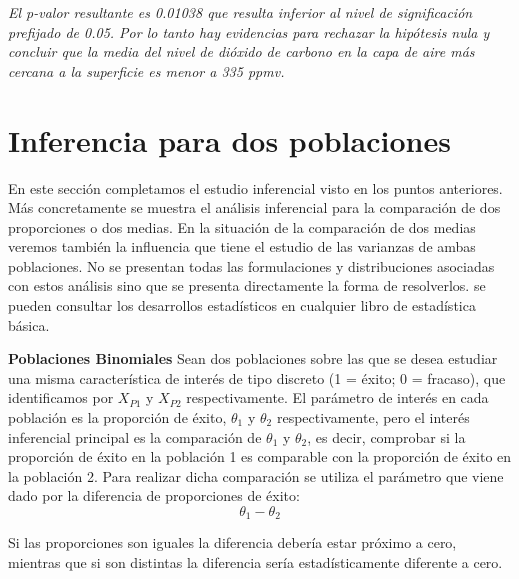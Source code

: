 \documentclass[
]{book}
\begin{document}
\emph{El p-valor resultante es 0.01038 que resulta inferior al nivel de significación prefijado de 0.05. Por lo tanto hay evidencias para rechazar la hipótesis nula y concluir que la media del nivel de dióxido de carbono en la capa de aire más cercana a la superficie es menor a 335 ppmv.}

\hypertarget{inferencia-para-dos-poblaciones}{%
\section{Inferencia para dos poblaciones}\label{inferencia-para-dos-poblaciones}}

En este sección completamos el estudio inferencial visto en los puntos anteriores. Más concretamente se muestra el análisis inferencial para la comparación de dos proporciones o dos medias. En la situación de la comparación de dos medias veremos también la influencia que tiene el estudio de las varianzas de ambas poblaciones. No se presentan todas las formulaciones y distribuciones asociadas con estos análisis sino que se presenta directamente la forma de resolverlos. se pueden consultar los desarrollos estadísticos en cualquier libro de estadística básica.

\textbf{Poblaciones Binomiales} Sean dos poblaciones sobre las que se desea estudiar una misma característica de interés de tipo discreto (1 = éxito; 0 = fracaso), que identificamos por \(X_{P1}\) y \(X_{P2}\) respectivamente. El parámetro de interés en cada población es la proporción de éxito, \(\theta_1\) y \(\theta_2\) respectivamente, pero el interés inferencial principal es la comparación de \(\theta_1\) y \(\theta_2\), es decir, comprobar si la proporción de éxito en la población 1 es comparable con la proporción de éxito en la población 2. Para realizar dicha comparación se utiliza el parámetro que viene dado por la diferencia de proporciones de éxito: \[\theta_1 - \theta_2\]

Si las proporciones son iguales la diferencia debería estar próximo a cero, mientras que si son distintas la diferencia sería estadísticamente diferente a cero.
\end{document}
